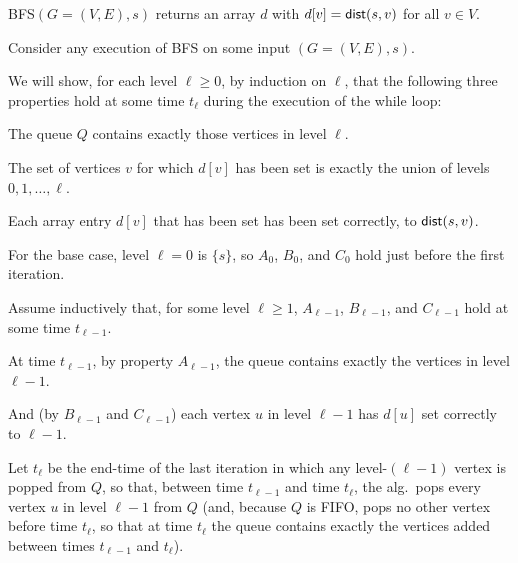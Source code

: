 \documentclass[11pt]{article}
\begin{document}
\begin{restatement}
\begin{lemma}[correctness]\label{graphs: lemma: correctness}
  \textsf{BFS}$(G=(V,E), s)$ returns an array $d$ with $d[v] = \operatorname{\sf dist}(s, v)$ for all $v\in V$.
\end{lemma}
\end{restatement}
\begin{longFormProof}%
  \step Consider any execution of \textsf{BFS} on some input $(G=(V,E), s)$.

  \step We will show, for each level $\ell\ge 0$, by induction on $\ell$, that
  the following three properties hold at some time $t_{\ell}$ during the execution of the while loop:
  \begin{mylist}
  \item[$A_\ell$---] The queue $Q$ contains exactly those vertices in level $\ell$.
  \item[$B_\ell$---] The set of vertices $v$ for which $d[v]$ has been set
    is exactly the union of levels $0, 1, \ldots, \ell$.
  \item[$C_\ell$---] Each array entry $d[v]$ that has been set has been set correctly, to $\operatorname{\sf dist}(s, v)$.
  \end{mylist}
  
  \step For the base case, level $\ell=0$ is $\{s\}$, so $A_0$, $B_0$, and $C_0$ hold just before the first iteration.

  \begin{block}
    \step Assume inductively that, for some level $\ell\ge 1$,
    $A_{\ell-1}$, $B_{\ell-1}$, and $C_{\ell-1}$ hold at some time $t_{\ell-1}$. 

    \step At time $t_{\ell-1}$, by property $A_{\ell-1}$, the queue contains exactly the vertices in level $\ell-1$.

    \step
    And (by $B_{\ell-1}$ and $C_{\ell-1}$) each vertex $u$ in level $\ell-1$ has $d[u]$ set correctly to $\ell-1$.

    \step Let $t_{\ell}$ be the end-time of the last iteration in which any level-$(\ell-1)$  vertex is popped from $Q$,
    so that, between time $t_{\ell-1}$ and time $t_{\ell}$, the alg.~pops every vertex $u$ in level $\ell-1$ from $Q$
    (and, because $Q$ is FIFO, pops no other vertex before time $t_{\ell}$,
    so that at time $t_{\ell}$ the queue contains exactly the vertices added between times $t_{\ell-1}$ and $t_{\ell}$).


\end{block}
\end{longFormProof}
\end{document}
